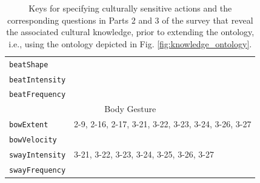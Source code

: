 \documentclass{CSSRforAfrica}
\begin{document}
\begin{table}[H]
\begin{center}
\begin{tabular}{|l l|}
{\footnotesize \verb+beatShape+} 	                         & {\footnotesize \verb++}\vspace{-1mm} \\
{\footnotesize \verb+beatIntensity+} 	                 & {\footnotesize \verb++} \vspace{-1mm}\\
{\footnotesize \verb+beatFrequency+} 	                 & {\footnotesize \verb++} \\
\hline
\multicolumn{2}{|c|}{{\footnotesize Body Gesture}} \\
\hline
{\footnotesize \verb+bowExtent+} 	                        & {\footnotesize 2-9, 2-16, 2-17, 3-21, 3-22, 3-23, 3-24, 3-26, 3-27} \vspace{-1mm}\\
{\footnotesize \verb+bowVelocity+}                       & {\footnotesize \verb++} \vspace{-1mm}\\
{\footnotesize \verb+swayIntensity+} 	                & {\footnotesize 3-21, 3-22, 3-23, 3-24, 3-25, 3-26, 3-27} \vspace{-1mm}\\
{\footnotesize \verb+swayFrequency+} 	                & {\footnotesize \verb++} \\
\hline \hline
\end{tabular}
\end{center}
\caption{Keys for specifying culturally sensitive actions and the corresponding questions in Parts 2 and 3 of the survey that reveal the associated cultural knowledge, prior to extending the ontology, i.e., using the ontology depicted in Fig. \ref{fig:knowledge_ontology}.}
\label{table:key-value_questions_all}
\end{table}

 
\end{document}
